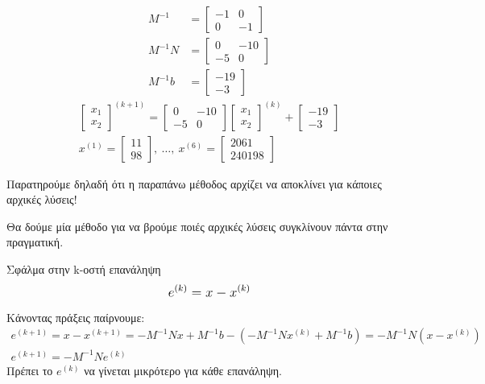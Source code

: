 \documentclass[11pt,a4paper,notitlepage,fleqn]{article}
\begin{document}
\begin{align*}
	M^{-1} &= \left[\begin{matrix}
	-1&0\\0&-1
	\end{matrix}\right] \\
	M^{-1}N &= \left[\begin{matrix}
	0&-10\\-5&0
	\end{matrix}\right] \\
	M^{-1}b &= \left[\begin{matrix}
	-19\\-3
	\end{matrix}\right]
\end{align*}
\begin{gather*}
	\left[\begin{matrix}
	x_1\\x_2
	\end{matrix}\right]^{(k+1)}
	= \left[\begin{matrix}
	0&-10\\-5&0
	\end{matrix}\right]\left[\begin{matrix}
	x_1\\x_2
	\end{matrix}\right]^{(k)}+\left[\begin{matrix}
	-19\\-3
	\end{matrix}\right] \\
	x^{(1)} = \left[\begin{matrix}
	11\\98
	\end{matrix}\right],\ \dots,\ x^{(6)} = \left[\begin{matrix}
	2061\\240198
	\end{matrix}\right]
\end{gather*}

Παρατηρούμε δηλαδή ότι η παραπάνω μέθοδος αρχίζει να αποκλίνει για κάποιες
αρχικές λύσεις!

Θα δούμε μία μέθοδο για να βρούμε ποιές αρχικές λύσεις συγκλίνουν πάντα
στην πραγματική.

\begin{defn}{Σφάλμα στην k-οστή επανάληψη}{}
	\[
	\mathlarger{
	e^{(k)} = x-x^{(k)}
    }
	\]
\end{defn}

Κάνοντας πράξεις παίρνουμε:
\begin{gather*}
	e^{(k+1)} = x-x^{(k+1)} = -M^{-1}Nx+M^{-1}b-\left(
	-M^{-1}Nx^{(k)}+M^{-1}b
	\right) = -M^{-1}N\left(x-x^{(k)}\right) \\
	e^{(k+1)} = -M^{-1}Ne^{(k)}
\end{gather*}
Πρέπει το \( e^{(k)} \) να γίνεται μικρότερο για κάθε επανάληψη.
\end{document}
